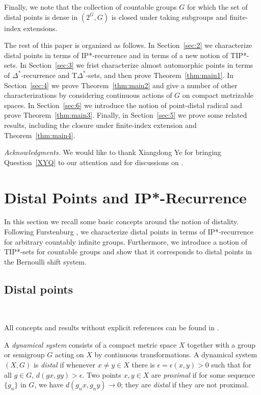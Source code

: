 \documentclass[11pt]{amsart}
\theoremstyle{definition}
\numberwithin{equation}{section}
\theoremstyle{definition}
\begin{document}
Finally, we note that the collection of countable groups $G$ for which the set of distal points is dense in $(2^G, G)$ is closed under taking subgroups and finite-index extensions. 

The rest of this paper is organized as follows. In Section~\ref{sec:2} we characterize distal points in terms of IP*-recurrence and in terms of a new notion of TIP*-sets. In Section~\ref{sec:3} we frist characterize almost automorphic points in terms of $\Delta^*$-recurrence and T$\Delta^*$-sets, and then prove Theorem~\ref{thm:main1}. In Section~\ref{sec:4} we prove Theorem~\ref{thm:main2} and give a number of other characterizations by considering continuous actions of $G$ on compact metrizable spaces. In Section~\ref{sec:6} we introduce the notion of point-distal radical and prove Theorem~\ref{thm:main3}. Finally, in Section~\ref{sec:5} we prove some related results, including the closure under finite-index extension and Theorem~\ref{thm:main4}. 

{\em Acknowledgments.} We would like to thank Xiangdong Ye for bringing Question~\ref{XYQ} to our attention and for discussions on \cite{XY}. 



\section{Distal Points and IP*-Recurrence\label{sec:2}}

In this section we recall some basic concepts around the notion of distality. Following Furstenburg \cite{Fur}, we characterize distal points in terms of IP*-recurrence for arbitrary countably infinite groups. Furthermore, we introduce a notion of TIP*-sets for countable groups and show that it corresponds to distal points in the Bernoulli shift system. 

\subsection{Distal points}\hfill\ 

All concepts and results without explicit references can be found in \cite{Fur}.

 A {\em dynamical system} consists of a compact metric space $X$ together with a group or semigroup $G$ acting on $X$ by continuous transformations. A dynamical system $(X,G)$ is {\em distal} if whenever $x\neq y\in X$ there is $\epsilon=\epsilon(x,y)>0$ such that for all $g\in G$, $d(gx, gy)>\epsilon$. Two points $x, y\in X$ are {\em proximal} if for some sequence $\{g_n\}$ in $G$, we have $d(g_nx,g_ny)\to 0$; they are {\em distal} if they are not proximal.
\end{document}
